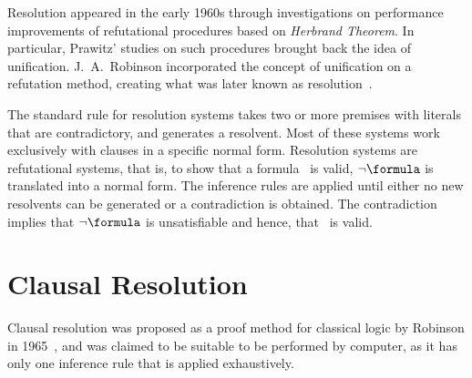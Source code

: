 Resolution appeared in the early 1960s through investigations on performance
improvements of refutational procedures based on \emph{Herbrand Theorem}. In
particular, Prawitz' studies on such procedures brought back the idea of
unification. J.~A.~Robinson incorporated the concept of unification on a
refutation method, creating what was later known as resolution~\cite{casanova}. 

The standard rule for resolution systems takes two or more premises with
literals that are contradictory, and generates a resolvent. Most of these systems
work exclusively with clauses in a specific normal form. Resolution systems are
refutational systems, that is, to show that a formula \formula~is valid, $\neg
\formula$ is translated into a normal form. The inference rules are applied
until either no new resolvents can be generated or a contradiction is obtained.
The contradiction implies that $\neg \formula$ is unsatisfiable and hence, that
\formula~is valid.


\section{Clausal Resolution}

Clausal resolution was proposed as a proof method for classical logic by
Robinson in 1965~\cite{Robinson65}, and was claimed to be suitable to be
performed by computer, as it has only one inference rule that is applied
exhaustively. 




